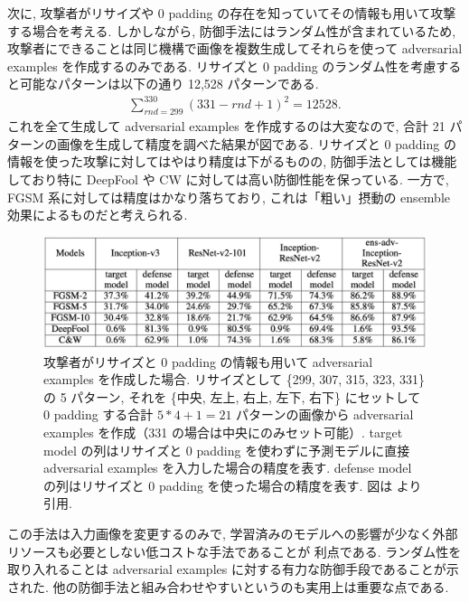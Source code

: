 次に, 攻撃者がリサイズや 0 padding の存在を知っていてその情報も用いて攻撃する場合を考える.
しかしながら, 防御手法にはランダム性が含まれているため, 攻撃者にできることは同じ機構で画像を複数生成してそれらを使って adversarial examples を作成するのみである.
リサイズと 0 padding のランダム性を考慮すると可能なパターンは以下の通り 12,528 パターンである.
%
\begin{eqnarray}
\sum_{rnd = 299}^{330} (331 - rnd + 1)^2 = 12528.
\label{eq:mitigating-adversarial-all-patterns}
\end{eqnarray}
%
これを全て生成して adversarial examples を作成するのは大変なので, 合計 21 パターンの画像を生成して精度を調べた結果が図である.
リサイズと 0 padding の情報を使った攻撃に対してはやはり精度は下がるものの, 防御手法としては機能しており特に DeepFool や CW に対しては高い防御性能を保っている.
一方で, FGSM 系に対しては精度はかなり落ちており, これは「粗い」摂動の ensemble 効果によるものだと考えられる.
%
\begin{figure}[htbp]
\begin{center}
\includegraphics[width=14.0cm]{figures/mitigating-adversarial-ensemble.pdf}
\end{center}
\caption{
攻撃者がリサイズと 0 padding の情報も用いて adversarial examples を作成した場合.
リサイズとして \{299, 307, 315, 323, 331\} の 5 パターン, それを \{中央, 左上, 右上, 左下, 右下\} にセットして 0 padding する合計 $5*4 + 1 = 21$ パターンの画像から adversarial examples を作成（331 の場合は中央にのみセット可能）.
target model の列はリサイズと 0 padding を使わずに予測モデルに直接 adversarial examples を入力した場合の精度を表す.
defense model の列はリサイズと 0 padding を使った場合の精度を表す.
図は \cite{xie2017mitigating} より引用.}
\label{fig:mitigating-adversarial-ensemble}
\end{figure}

この手法は入力画像を変更するのみで, 学習済みのモデルへの影響が少なく外部リソースも必要としない低コストな手法であることが
利点である.
ランダム性を取り入れることは adversarial examples に対する有力な防御手段であることが示された.
他の防御手法と組み合わせやすいというのも実用上は重要な点である.



